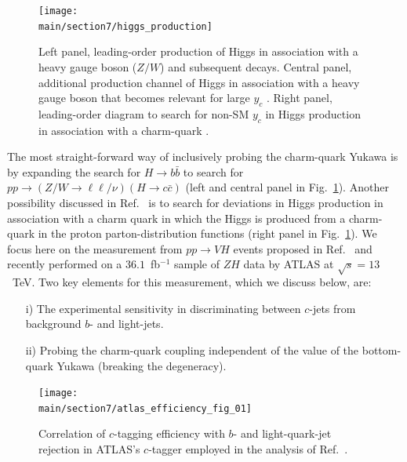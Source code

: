 \documentclass[../report.tex]{subfiles}
\providecommand{\main}{..}
\begin{document}
\begin{figure}[h]
	\centering
	\texttt{[image: \\main/section7/higgs\_production]}
	\caption{Left panel, leading-order production of Higgs in association with a heavy gauge boson ($Z/W$) and 
		subsequent decays. Central panel, additional production channel of Higgs in association 
		with a heavy gauge boson that becomes relevant for large $y_c$ \cite{Perez:2015aoa}.
		Right panel, leading-order diagram to search for non-SM $y_c$ in Higgs production in 
		association with a charm-quark \cite{Brivio:2015fxa}.
	\label{fig:higgsproductionHcc}
	}
\end{figure}

The most straight-forward way of inclusively probing the charm-quark Yukawa is by 
expanding the search for $H\to b\bar b$ to search for 
$pp \to (Z/W\to\ell\ell/\nu) (H\to c\bar c)$ \cite{Perez:2015aoa}
(left and central panel in Fig.~\ref{fig:higgsproductionHcc}).
Another possibility discussed in Ref.~\cite{Brivio:2015fxa} is to search for deviations in Higgs production 
in association with a charm quark in which the Higgs is produced from a charm-quark in the proton 
parton-distribution functions (right panel in Fig.~\ref{fig:higgsproductionHcc}).
We focus here on the measurement from $pp\to VH$ events proposed in Ref.~\cite{Perez:2015aoa}
and recently performed on a $36.1$~fb$^{-1}$ sample of $ZH$ data by ATLAS \cite{Aaboud:2018fhh}
at $\sqrt{s}=13$~TeV.
Two key elements for this measurement, which we discuss below, are:
\begin{itemize}
	\item[i)] The experimental sensitivity in discriminating between $c$-jets from
		background $b$- and light-jets.
	\item[ii)] Probing the charm-quark coupling independent of the value of the 
		bottom-quark Yukawa (breaking the degeneracy).
\end{itemize}

\begin{figure}[h]
	\centering
	\texttt{[image: \\main/section7/atlas\_efficiency\_fig\_01]}
	\caption{Correlation of $c$-tagging efficiency with $b$- and light-quark-jet rejection
	in ATLAS's $c$-tagger employed in the analysis of Ref.~\cite{Aaboud:2018fhh}.
\label{fig:ATLASctagefficiency}}
\end{figure}
\end{document}
